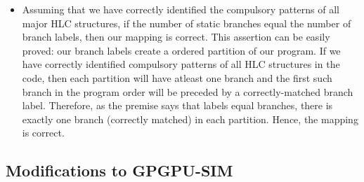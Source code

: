 \begin{itemize}
	\item Assuming that we have correctly identified the compulsory patterns of all major HLC structures, if the number of static branches equal the number of branch labels, then our mapping is correct.
 This assertion can be easily proved: our branch labels create a ordered partition of our program. If we have correctly identified compulsory patterns of all HLC structures in the code, then each partition will have atleast one branch and the first such branch in the program order will be preceded by a correctly-matched branch label. Therefore, as the premise says that labels equal branches, there is exactly one branch (correctly matched) in each partition. Hence, the mapping is correct. 
\end{itemize}

\subsection{Modifications to GPGPU-SIM}

